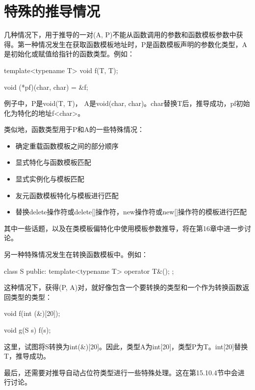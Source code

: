 \section{特殊的推导情况}
几种情况下，用于推导的一对(A, P)不能从函数调用的参数和函数模板参数中获得。第一种情况发生在获取函数模板地址时，P是函数模板声明的参数化类型，A是初始化或赋值给指针的函数类型。例如：

\begin{cpp}
template<typename T>
void f(T, T);

void (*pf)(char, char) = &f;
\end{cpp}

例子中，P是void(T, T)， A是void(char, char)。char替换T后，推导成功，pf初始化为特化的地址f<char>。

类似地，函数类型用于P和A的一些特殊情况：

\begin{itemize}
\item 
确定重载函数模板之间的部分顺序

\item 
显式特化与函数模板匹配

\item 
显式实例化与模板匹配

\item 
友元函数模板特化与模板进行匹配

\item 
替换delete操作符或delete[]操作符，new操作符或new[]操作符的模板进行匹配
\end{itemize}

其中一些话题，以及在类模板偏特化中使用模板参数推导，将在第16章中进一步讨论。

另一种特殊情况发生在转换函数模板中。例如：

\begin{cpp}
class S {
	public:
	template<typename T> operator T&();
};
\end{cpp}

这种情况下，获得(P, A)对，就好像包含一个要转换的类型和一个作为转换函数返回类型的类型：

\begin{cpp}
void f(int (&)[20]);

void g(S s)
{
	f(s);
}
\end{cpp}

这里，试图将S转换为int(\&)[20]。因此，类型A为int[20]，类型P为T。int[20]替换T，推导成功。

最后，还需要对推导自动占位符类型进行一些特殊处理。这在第15.10.4节中会进行讨论。


































